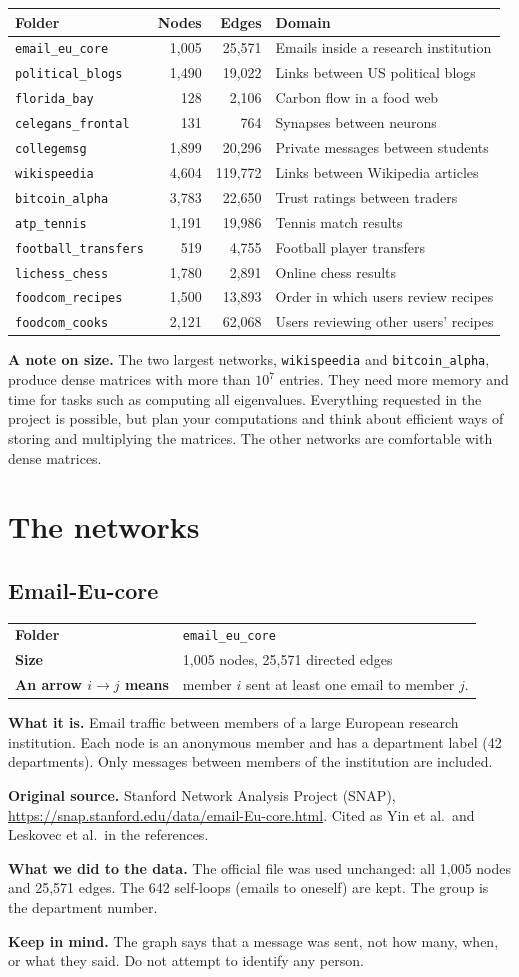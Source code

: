 \documentclass[11pt,a4paper]{article}
\makeatletter
\newcommand{\code}[1]{\texttt{#1}}
\newcommand{\dataset}[9]{%
  \subsection{#1}
  \begin{tabularx}{\textwidth}{@{}>{\bfseries}l X@{}}
    Folder & \code{#2}\\
    Size & #3 nodes, #4 directed edges\\
    An arrow $i\to j$ means & #5\\
  \end{tabularx}

  \textbf{What it is.} #6

  \textbf{Original source.} #7

  \textbf{What we did to the data.} #8

  \textbf{Keep in mind.} #9
}
\makeatother
\begin{document}
\begin{center}
\small
\begin{tabularx}{\textwidth}{@{}l r r X@{}}\toprule
Folder & Nodes & Edges & Domain\\\midrule
\code{email\_eu\_core} & 1,005 & 25,571 & Emails inside a research institution\\
\code{political\_blogs} & 1,490 & 19,022 & Links between US political blogs\\
\code{florida\_bay} & 128 & 2,106 & Carbon flow in a food web\\
\code{celegans\_frontal} & 131 & 764 & Synapses between neurons\\
\code{collegemsg} & 1,899 & 20,296 & Private messages between students\\
\code{wikispeedia} & 4,604 & 119,772 & Links between Wikipedia articles\\
\code{bitcoin\_alpha} & 3,783 & 22,650 & Trust ratings between traders\\
\code{atp\_tennis} & 1,191 & 19,986 & Tennis match results\\
\code{football\_transfers} & 519 & 4,755 & Football player transfers\\
\code{lichess\_chess} & 1,780 & 2,891 & Online chess results\\
\code{foodcom\_recipes} & 1,500 & 13,893 & Order in which users review recipes\\
\code{foodcom\_cooks} & 2,121 & 62,068 & Users reviewing other users' recipes\\
\bottomrule
\end{tabularx}
\end{center}

\textbf{A note on size.} The two largest networks, \code{wikispeedia} and \code{bitcoin\_alpha}, produce dense matrices with more than $10^7$ entries. They need more memory and time for tasks such as computing all eigenvalues. Everything requested in the project is possible, but plan your computations and think about efficient ways of storing and multiplying the matrices. The other networks are comfortable with dense matrices.

\section{The networks}

\dataset{Email-Eu-core}{email\_eu\_core}{1,005}{25,571}
{member $i$ sent at least one email to member $j$.}
{Email traffic between members of a large European research institution. Each node is an anonymous member and has a department label (42 departments). Only messages between members of the institution are included.}
{Stanford Network Analysis Project (SNAP), \url{https://snap.stanford.edu/data/email-Eu-core.html}. Cited as Yin et al.\ and Leskovec et al.\ in the references.}
{The official file was used unchanged: all 1,005 nodes and 25,571 edges. The 642 self-loops (emails to oneself) are kept. The group is the department number.}
{The graph says that a message was sent, not how many, when, or what they said. Do not attempt to identify any person.}
\end{document}
